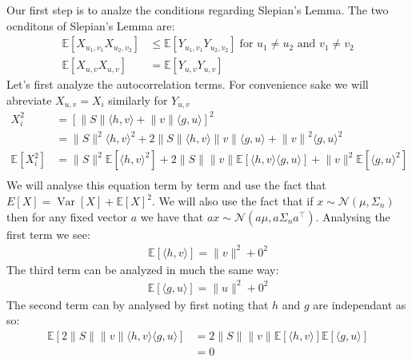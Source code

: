 Our first step is to analze the conditions regarding Slepian's Lemma. The two ocnditons of Slepian's Lemma are:
\begin{align*}
    \mathds{E}\left[X_{u_1,v_1}X_{u_2,v_2}\right] &\leq \mathds{E}\left[ Y_{u_1,v_1}Y_{u_2, v_2}\right] \; \text{for } u_1 \neq u_2 \text{ and } v_1 \neq v_2 \\
    \mathds{E}\left[X_{u,v}X_{u,v}\right] &= \mathds{E}\left[ Y_{u,v}Y_{u,v}\right]
\end{align*}
Let's first analyze the autocorrelation terms. For convenience sake we will abreviate $X_{u,v} = X_i$ similarly for
$Y_{u, v}$
\begin{align*}
    X_i^2 &= {\left[ \lVert S \rVert\langle h,v \rangle + \lVert v \rVert \langle g,u \rangle \right]}^2 \\
          &= \lVert S \rVert^2 \langle h,v\rangle^2 + 2\lVert S \rVert\langle h,v\rangle \lVert v \rVert \langle g,u \rangle + {\lVert v \rVert}^2 {\langle g,u \rangle}^2 \\
    \mathds{E}\left[ X_i^2\right] &= \lVert S \rVert^2 \mathds{E}\left[\langle h,v \rangle^2\right] + 2\lVert S \rVert \lVert v \rVert \mathds{E}\left[\langle h,v\rangle \langle g, u\rangle\right] + \lVert v \rVert^2 \mathds{E}\left[\langle g, u\rangle^2\right] \\
\end{align*}
We will analyse this equation term by term and use the fact that $E\left[X\right] = \operatorname{Var}\left[X\right] +
{\mathds{E}\left[X\right]}^2$. We will also use the fact that if $x \sim \mathcal{N}(\mu, \Sigma_n)$ then for any fixed
vector $a$ we have that $ax \sim \mathcal{N}(a\mu, a\Sigma_n a^{\top})$. Analysing the first term we see:
\begin{align*}
    \mathds{E}\left[\langle h, v\rangle\right] = \lVert v \rVert^2 + 0^2
\end{align*}
The third term can be analyzed in much the same way:
\begin{align*}
    \mathds{E}\left[\langle g, u\rangle\right] = \lVert u \rVert^2 + 0^2
\end{align*}
The second term can by analysed by first noting that $h$ and $g$ are independant as so:
\begin{align*}
    \mathds{E}\left[2\lVert S \rVert \lVert v \rVert\langle h,v\rangle \langle g,u \rangle\right] &= 2\lVert S \rVert\lVert v \rVert \mathds{E}\left[\langle h,v \rangle\right]\mathds{E}\left[\langle g,u \rangle\right] \\
                                                                                                  &= 0
\end{align*}
